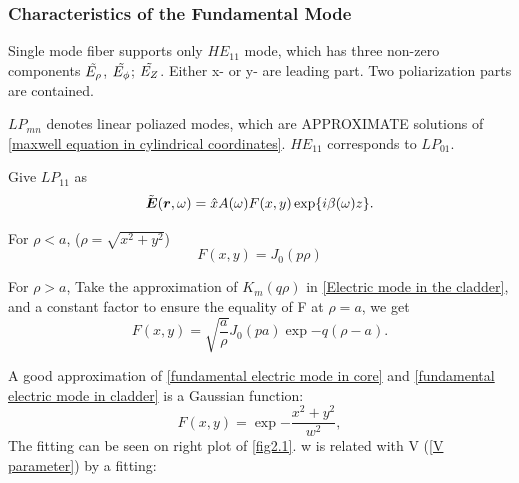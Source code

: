 \documentclass[12pt]{extarticle}
\numberwithin{equation}{section}
\numberwithin{figure}{section}
\numberwithin{table}{section}
\newcommand{\<}{\langle}
\renewcommand{\>}{\rangle}
\theoremstyle{definition}
\newcommand{\SubItem}[1]{
    {\setlength\itemindent{15pt} \item[-] #1}
}
\begin{document}
        \subsubsection{Characteristics of the Fundamental Mode}
            \begin{itemize}
                \item Single mode fiber supports only $HE_11$ mode, which has three non-zero components $\Tilde{E_\rho}$, $\Tilde{E_\phi}$; $\Tilde{E_Z}$. Either x- or y- are leading part. Two poliarization parts are contained.
                \item $LP_{mn}$ denotes linear poliazed modes, which are APPROXIMATE solutions of \autoref{maxwell equation in cylindrical coordinates}.  $HE_{11}$ corresponds to $LP_{01}$.
                \item Give $LP_{11}$ as 
                    \begin{equation}
                        \Tilde{\boldsymbol{E}}(\boldsymbol{r},\omega) = \hat{x}{A(\omega)F(x,y)\exp{i\beta(\omega)z}}.
                    \end{equation}
                    \SubItem{For $\rho<a$, ($\rho=\sqrt{x^2+y^2}$)
                        \begin{equation}
                            F(x,y)=J_0(p\rho)
                            \label{fundamental electric mode in core}
                        \end{equation}
                    }
                    \SubItem{For $\rho>a$, Take the approximation of $K_m(q\rho)$ in \autoref{Electric mode in the cladder}, and  a constant factor to ensure the equality of F at $\rho=a$, we get
                        \begin{equation}
                            F(x,y)=\sqrt{\frac{a}{\rho}}J_0(pa)\exp{-q(\rho-a)}.
                            \label{fundamental electric mode in cladder}
                        \end{equation}
                    }
                \item A good approximation of \autoref{fundamental electric mode in core} and \autoref{fundamental electric mode in cladder} is a Gaussian function:
                    \begin{equation}
                        F(x,y)=\exp{-\frac{x^2+y^2}{w^2}},
                    \end{equation}
                    The fitting can be seen on right plot of \autoref{fig2.1}. w is related with V (\autoref{V parameter}) by a fitting:
                    \begin{equation}

\end{equation}
\end{itemize}
\end{document}

